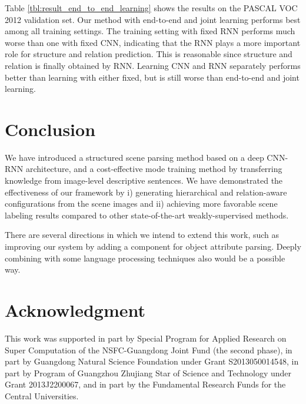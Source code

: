 \documentclass[10pt,twocolumn,letterpaper]{article}
\begin{document}
Table \ref{tbl:result_end_to_end_learning} shows the results on the PASCAL VOC 2012 validation set. Our method with end-to-end and joint learning performs best among all training settings. The training setting with fixed RNN performs much worse than one with fixed CNN, indicating that the RNN plays a more important role for structure and relation prediction. This is reasonable since structure and relation is finally obtained by RNN. Learning CNN and RNN separately performs better than learning with either fixed, but is still worse than end-to-end and joint learning.












\section{Conclusion}

We have introduced a structured scene parsing method based on a deep CNN-RNN architecture, and a cost-effective mode training method by transferring knowledge from image-level descriptive sentences. We have demonstrated the effectiveness of our framework by i) generating hierarchical and relation-aware configurations from the scene images and ii) achieving more favorable scene labeling results compared to other state-of-the-art weakly-supervised methods.

There are several directions in which we intend to extend this work, such as improving our system by adding a component for object attribute parsing. Deeply combining with some language processing techniques also would be a possible way.

\section*{Acknowledgment}

This work was supported in part by Special Program for Applied Research on Super Computation of the NSFC-Guangdong Joint Fund (the second phase), in part by Guangdong Natural Science Foundation under Grant S2013050014548, in part by Program of Guangzhou Zhujiang Star of Science and Technology under Grant 2013J2200067, and in part by the Fundamental Research Funds for the Central Universities.


{\small


}
\end{document}
